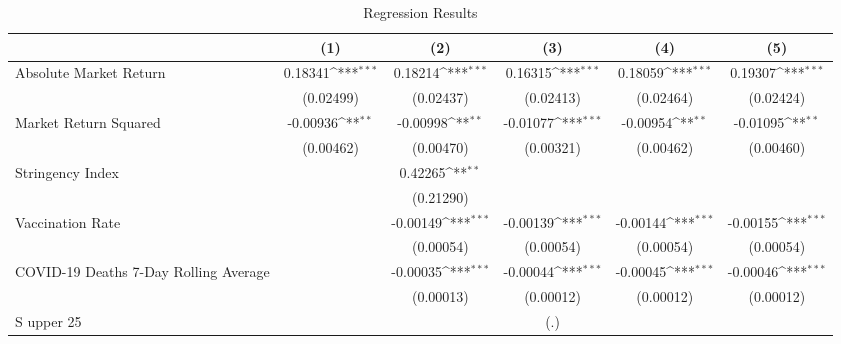 \begin{table}[htbp]\centering
\def\sym#1{\ifmmode^{#1}\else\(^{#1}\)\fi}
\caption{Regression Results \label{reg1}}
\begin{tabular}{l*{5}{c}}
\toprule
                    &\multicolumn{1}{c}{(1)}         &\multicolumn{1}{c}{(2)}         &\multicolumn{1}{c}{(3)}         &\multicolumn{1}{c}{(4)}         &\multicolumn{1}{c}{(5)}         \\
\midrule
Absolute Market Return&     0.18341\sym{***}&     0.18214\sym{***}&     0.16315\sym{***}&     0.18059\sym{***}&     0.19307\sym{***}\\
                    &   (0.02499)         &   (0.02437)         &   (0.02413)         &   (0.02464)         &   (0.02424)         \\
\addlinespace
Market Return Squared&    -0.00936\sym{**} &    -0.00998\sym{**} &    -0.01077\sym{***}&    -0.00954\sym{**} &    -0.01095\sym{**} \\
                    &   (0.00462)         &   (0.00470)         &   (0.00321)         &   (0.00462)         &   (0.00460)         \\
\addlinespace
Stringency Index    &                     &     0.42265\sym{**} &                     &                     &                     \\
                    &                     &   (0.21290)         &                     &                     &                     \\
\addlinespace
Vaccination Rate    &                     &    -0.00149\sym{***}&    -0.00139\sym{***}&    -0.00144\sym{***}&    -0.00155\sym{***}\\
                    &                     &   (0.00054)         &   (0.00054)         &   (0.00054)         &   (0.00054)         \\
\addlinespace
COVID-19 Deaths 7-Day Rolling Average&                     &    -0.00035\sym{***}&    -0.00044\sym{***}&    -0.00045\sym{***}&    -0.00046\sym{***}\\
                    &                     &   (0.00013)         &   (0.00012)         &   (0.00012)         &   (0.00012)         \\
\addlinespace
S upper 25%
                    &                     &                     &         (.)         &                     &                     \\

\end{tabular}
\end{table}
